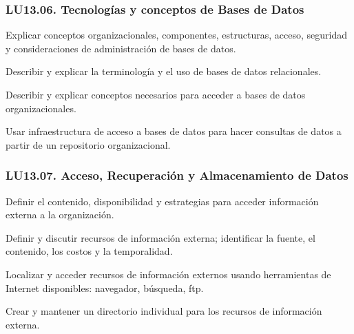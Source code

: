 \subsubsection{LU13.06. Tecnologías y conceptos de Bases de Datos}\label{sec:BOK-LU13.06}\label{sec:LU13.06}
\begin{LearningUnit}
\begin{LUGoal}
\item Explicar conceptos organizacionales, componentes, estructuras, acceso, seguridad y consideraciones de administración de bases de datos.
\end{LUGoal}

\begin{LUObjective}
\item Describir y explicar la terminología y el uso de bases de datos relacionales.
\item Describir y explicar conceptos necesarios para acceder a bases de datos organizacionales.
\item Usar infraestructura de acceso a bases de datos para hacer consultas de datos a partir de un repositorio organizacional.
\end{LUObjective}
\end{LearningUnit}

\subsubsection{LU13.07. Acceso, Recuperación y Almacenamiento de Datos}\label{sec:BOK-LU13.07}\label{sec:LU13.07}
\begin{LearningUnit}
\begin{LUGoal}
\item Definir el contenido, disponibilidad y estrategias para acceder información externa a la organización.
\end{LUGoal}

\begin{LUObjective}
\item Definir y discutir recursos de información externa; identificar la fuente, el contenido, los costos y la temporalidad.
\item Localizar y acceder recursos de información externos usando herramientas de Internet disponibles: navegador, búsqueda, ftp.
\item Crear y mantener un directorio individual para los recursos de información externa.
\end{LUObjective}
\end{LearningUnit}

